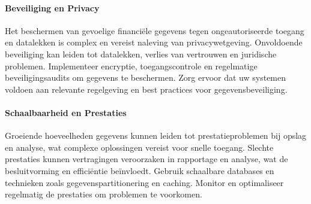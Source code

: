 \paragraph{Beveiliging en Privacy}
Het beschermen van gevoelige financiële gegevens tegen ongeautoriseerde toegang en datalekken is complex en vereist naleving van privacywetgeving. Onvoldoende beveiliging kan leiden tot datalekken, verlies van vertrouwen en juridische problemen. Implementeer encryptie, toegangscontrole en regelmatige beveiligingsaudits om gegevens te beschermen. Zorg ervoor dat uw systemen voldoen aan relevante regelgeving en best practices voor gegevensbeveiliging.

\paragraph{Schaalbaarheid en Prestaties}
Groeiende hoeveelheden gegevens kunnen leiden tot prestatieproblemen bij opslag en analyse, wat complexe oplossingen vereist voor snelle toegang. Slechte prestaties kunnen vertragingen veroorzaken in rapportage en analyse, wat de besluitvorming en efficiëntie beïnvloedt. Gebruik schaalbare databases en technieken zoals gegevenspartitionering en caching. Monitor en optimaliseer regelmatig de prestaties om problemen te voorkomen.
